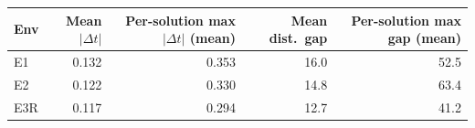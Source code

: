 \begin{tabular}{lrrrr}
\hline
Env & Mean $|\Delta t|$ & Per-solution max $|\Delta t|$ (mean) & Mean dist.\ gap & Per-solution max gap (mean) \\
\hline
E1 & 0.132 & 0.353 & 16.0 & 52.5 \\
E2 & 0.122 & 0.330 & 14.8 & 63.4 \\
E3R & 0.117 & 0.294 & 12.7 & 41.2 \\
\hline
\end{tabular}
